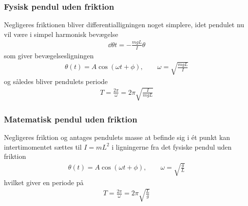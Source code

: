 \subsubsection*{Fysisk pendul uden friktion}
Negligeres friktionen bliver differentialligningen noget simplere, idet pendulet nu vil være i simpel harmonisk bevægelse
\begin{align*}
\dd{\theta}{t} = -\frac{mgL}{I}\theta
\end{align*}
som giver bevægelsesligningen
\begin{align*}
\theta(t) = A\cos\left(\omega t + \phi\right), \qquad \omega = \sqrt{\frac{mgL}{I}}
\end{align*}
og således bliver pendulets periode
\begin{align*}
T = \frac{2\pi}{\omega} = 2\pi\sqrt{\frac{I}{mgL}}
\end{align*}

\subsubsection*{Matematisk pendul uden friktion}
Negligeres friktion og antages pendulets masse at befinde sig i ét punkt kan intertimomentet sættes til $I=mL^2$ i ligningerne fra det fysiske pendul uden friktion
\begin{align*}
\theta(t) = A\cos\left(\omega t + \phi\right), \qquad \omega = \sqrt{\frac{g}{L}}
\end{align*}
hvilket giver en periode på
\begin{align*}
T = \frac{2\pi}{\omega} = 2\pi\sqrt{\frac{L}{g}}
\end{align*}